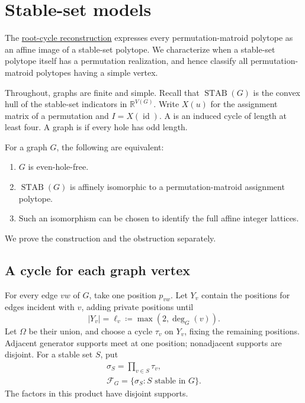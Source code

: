 
\section[stableSetModels]{Stable-set models}

The \href{permutations.htm#rootCycles}{root-cycle reconstruction} expresses
every permutation-matroid polytope as an affine image of a stable-set
polytope. We characterize when a stable-set polytope itself has a
permutation realization, and hence classify all permutation-matroid
polytopes having a simple vertex.

Throughout, graphs are finite and simple. Recall that
$\operatorname{STAB}(G)$ is the convex hull of the stable-set indicators
in $\mathbb R^{V(G)}$. Write $X(u)$ for the assignment matrix of a
permutation and $I=X(\operatorname{id})$.
A  is an induced cycle of length at
least four. A graph is  if every hole has odd length.

\begin{theorem}
For a graph $G$, the following are equivalent:
\begin{enumerate}
\item $G$ is even-hole-free.
\item $\operatorname{STAB}(G)$ is affinely isomorphic to a
permutation-matroid assignment polytope.
\item Such an isomorphism can be chosen to identify the full affine
integer lattices.
\end{enumerate}
\end{theorem}

We prove the construction and the obstruction separately.

\subsection[contactConstruction]{A cycle for each graph vertex}

For every edge $vw$ of $G$, take one position $p_{vw}$. Let $Y_v$
contain the positions for edges incident with $v$, adding private
positions until
\[
 |Y_v|=\ell_v\coloneqq\max(2,\deg_G(v)).
\]
Let $\Omega$ be their union, and choose a cycle $\tau_v$ on $Y_v$,
fixing the remaining positions. Adjacent generator supports meet at
one position; nonadjacent supports are disjoint.
For a stable set $S$, put
\[
 \begin{gathered}
 \sigma_S=\prod_{v\in S}\tau_v,\\
 \mathcal F_G=\{\sigma_S:S\text{ stable in }G\}.
 \end{gathered}
\]
The factors in this product have disjoint supports.


